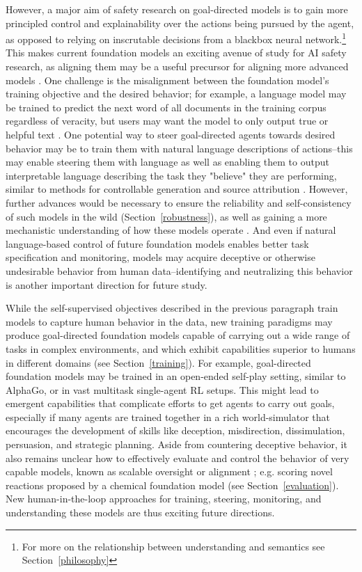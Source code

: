 However, a major aim of safety research on goal-directed models is to gain more principled control and explainability over the actions being pursued by the agent, as opposed to relying on inscrutable decisions from a blackbox neural network.\footnote{For more on the relationship between understanding and semantics see Section~\ref{philosophy}} This makes current foundation models an exciting avenue of study for AI safety research, as aligning them may be a useful precursor for aligning more advanced models \citep{christiano2016prosaic, cotra2021narrow, Kenton2021AlignmentOL}. One challenge is the misalignment between the foundation model's training objective and the desired behavior; for example, a language model may be trained to predict the next word of all documents in the training corpus regardless of veracity, but users may want the model to only output true or helpful text \citep{tamkin2021understanding}. One potential way to steer goal-directed agents towards desired behavior may be to train them with natural language descriptions of actions--this may enable steering them with language as well as enabling them to output interpretable language describing the task they "believe" they are performing, similar to methods for controllable generation and source attribution \citep[e.g. ][see also Section~\ref{robotics}, Section~\ref{interaction}, and Section~\ref{interpretability}]{keskar2019ctrl}. However, further advances would be necessary to ensure the reliability and self-consistency of such models in the wild (Section~\ref{robustness}), as well as gaining a more mechanistic understanding of how these models operate \citep[also see Section~\ref{interpretability}]{cammarata2020thread}. And even if natural language-based control of future foundation models enables better task specification and monitoring, models may acquire deceptive or otherwise undesirable behavior from human data--identifying and neutralizing this behavior is another important direction for future study.

While the self-supervised objectives described in the previous paragraph train models to capture human behavior in the data, new training paradigms may produce goal-directed foundation models capable of carrying out a wide range of tasks in complex environments, and which exhibit capabilities superior to humans in different domains (see Section~\ref{training}). For example, goal-directed foundation models may be trained in an open-ended self-play setting, similar to AlphaGo, or in vast multitask single-agent RL setups. This might lead to emergent capabilities that complicate efforts to get agents to carry out goals, especially if many agents are trained together in a rich world-simulator that encourages the development of skills like deception, misdirection, dissimulation, persuasion, and strategic planning. Aside from countering deceptive behavior, it also remains unclear how to effectively evaluate and control the behavior of very capable models, known as scalable oversight or alignment \citep{amodei2016concrete, Leike2018ScalableAA}; e.g. scoring novel reactions proposed by a chemical foundation model (see Section~\ref{evaluation}). New human-in-the-loop approaches for training, steering, monitoring, and understanding these models are thus exciting future directions.

